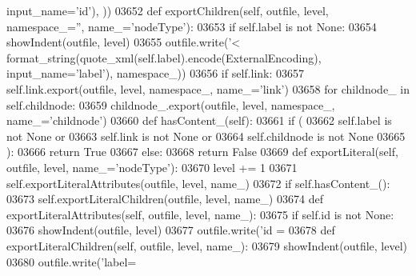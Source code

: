 \begin{DoxyCode}
{{{{{{{{{{{{{{{{{{{{{{{{{{{{{{{{{{{{{{{{{{{{{{{{{{{{{{{{{{{{{{{{{{{{{{{{{{{{{{{{{{{{{{{{{{{{{{{{{{{{{{{{{{{{{{{{{{{{{{{{{{{{{{{{{{{{{{{{{{{{{{{{{{{{{{{{{{{{{{{{{{{{{{{{{{{{{{{{{{{{{{{{{{{{{{{{{{{{{{{{{{{{{{{{{{{{{{{{{{{{{{{{{{{{{{{{{{{      input\_name=\textcolor{stringliteral}{'id'}), ))
03652     \textcolor{keyword}{def }exportChildren(self, outfile, level, namespace\_='', name\_='nodeType'):
03653         \textcolor{keywordflow}{if} self.label \textcolor{keywordflow}{is} \textcolor{keywordflow}{not} \textcolor{keywordtype}{None}:
03654             showIndent(outfile, level)
03655             outfile.write(\textcolor{stringliteral}{'<%
      format_string(quote_xml(self.label).encode(ExternalEncoding), input\_name=\textcolor{stringliteral}{'label'}), namespace\_))
03656         \textcolor{keywordflow}{if} self.link:
03657             self.link.export(outfile, level, namespace\_, name\_=\textcolor{stringliteral}{'link'})
03658         \textcolor{keywordflow}{for} childnode\_ \textcolor{keywordflow}{in} self.childnode:
03659             childnode\_.export(outfile, level, namespace\_, name\_=\textcolor{stringliteral}{'childnode'})
03660     \textcolor{keyword}{def }hasContent_(self):
03661         \textcolor{keywordflow}{if} (
03662             self.label \textcolor{keywordflow}{is} \textcolor{keywordflow}{not} \textcolor{keywordtype}{None} \textcolor{keywordflow}{or}
03663             self.link \textcolor{keywordflow}{is} \textcolor{keywordflow}{not} \textcolor{keywordtype}{None} \textcolor{keywordflow}{or}
03664             self.childnode \textcolor{keywordflow}{is} \textcolor{keywordflow}{not} \textcolor{keywordtype}{None}
03665             ):
03666             \textcolor{keywordflow}{return} \textcolor{keyword}{True}
03667         \textcolor{keywordflow}{else}:
03668             \textcolor{keywordflow}{return} \textcolor{keyword}{False}
03669     \textcolor{keyword}{def }exportLiteral(self, outfile, level, name\_='nodeType'):
03670         level += 1
03671         self.exportLiteralAttributes(outfile, level, name\_)
03672         \textcolor{keywordflow}{if} self.hasContent_():
03673             self.exportLiteralChildren(outfile, level, name\_)
03674     \textcolor{keyword}{def }exportLiteralAttributes(self, outfile, level, name\_):
03675         \textcolor{keywordflow}{if} self.id \textcolor{keywordflow}{is} \textcolor{keywordflow}{not} \textcolor{keywordtype}{None}:
03676             showIndent(outfile, level)
03677             outfile.write(\textcolor{stringliteral}{'id = %
03678     \textcolor{keyword}{def }exportLiteralChildren(self, outfile, level, name\_):
03679         showIndent(outfile, level)
03680         outfile.write(\textcolor{stringliteral}{'label=%
}}}}}}}}}}}}}}}}}}}}}}}}}}}}}}}}}}}}}}}}}}}}}}}}}}}}}}}}}}}}}}}}}}}}}}}}}}}}}}}}}}}}}}}}}}}}}}}}}}}}}}}}}}}}}}}}}}}}}}}}}}}}}}}}}}}}}}}}}}}}}}}}}}}}}}}}}}}}}}}}}}}}}}}}}}}}}}}}}}}}}}}}}}}}}}}}}}}}}}}}}}}}}}}}}}}}}}}}}}}}}}}}}}}}}}}}}}}}}}
\end{DoxyCode}
